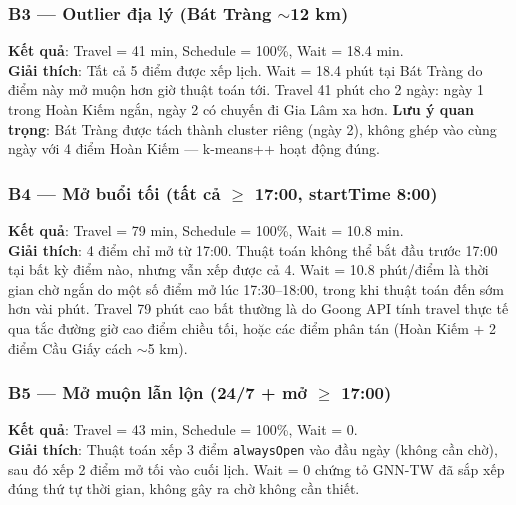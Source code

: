 \documentclass[12pt,a4paper]{article}
\begin{document}
\subsubsection*{B3 --- Outlier địa lý (Bát Tràng $\sim$12 km)}
\begin{tcolorbox}[warnbox, title={B3 --- Kiểm tra clustering outlier}]
\textbf{Kết quả}: Travel = 41 min, Schedule = 100\%, Wait = 18.4 min.\\
\textbf{Giải thích}: Tất cả 5 điểm được xếp lịch. Wait = 18.4 phút tại Bát Tràng do điểm này mở muộn
hơn giờ thuật toán tới. Travel 41 phút cho 2 ngày: ngày 1 trong Hoàn Kiếm ngắn, ngày 2 có chuyến đi
Gia Lâm xa hơn.
\textbf{Lưu ý quan trọng}: Bát Tràng được tách thành cluster riêng (ngày 2), không ghép vào cùng
ngày với 4 điểm Hoàn Kiếm --- k-means++ hoạt động đúng. \checkmark
\end{tcolorbox}

\subsubsection*{B4 --- Mở buổi tối (tất cả $\geq$ 17:00, startTime 8:00)}
\begin{tcolorbox}[warnbox, title={B4 --- Kiểm tra wait time scheduling}]
\textbf{Kết quả}: Travel = 79 min, Schedule = 100\%, Wait = 10.8 min.\\
\textbf{Giải thích}: 4 điểm chỉ mở từ 17:00. Thuật toán không thể bắt đầu trước 17:00 tại bất kỳ
điểm nào, nhưng vẫn xếp được cả 4. Wait = 10.8 phút/điểm là thời gian chờ ngắn do một số điểm mở
lúc 17:30--18:00, trong khi thuật toán đến sớm hơn vài phút.
Travel 79 phút cao bất thường là do Goong API tính travel thực tế qua tắc đường giờ cao điểm chiều tối,
hoặc các điểm phân tán (Hoàn Kiếm + 2 điểm Cầu Giấy cách $\sim$5 km).
\end{tcolorbox}

\subsubsection*{B5 --- Mở muộn lẫn lộn (24/7 + mở $\geq$ 17:00)}
\begin{tcolorbox}[warnbox, title={B5 --- Kiểm tra time-window sequencing}]
\textbf{Kết quả}: Travel = 43 min, Schedule = 100\%, Wait = 0.\\
\textbf{Giải thích}: Thuật toán xếp 3 điểm \texttt{alwaysOpen} vào đầu ngày (không cần chờ), sau đó
xếp 2 điểm mở tối vào cuối lịch. Wait = 0 chứng tỏ GNN-TW đã sắp xếp đúng thứ tự thời gian,
không gây ra chờ không cần thiết.
\end{tcolorbox}
\end{document}
